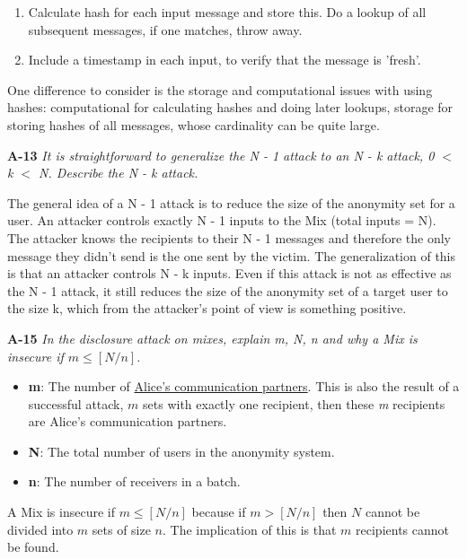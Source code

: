 \documentclass[a4paper]{article}
\newcommand{\Q}[2]{ \vspace{10pt} \textbf{#1} \textit{#2} }
\newcommand{\A}[1]{ #1 }
\begin{document}
\A{
  \begin{enumerate}
    \item Calculate hash for each input message and store this.
    Do a lookup of all subsequent messages, if one matches, 
    throw away.
    \item Include a timestamp in each input, to verify that 
    the message is 'fresh'.
  \end{enumerate}

  One difference to consider is the storage and computational
  issues with using hashes: computational for calculating
  hashes and doing later lookups, storage for storing hashes of
  all messages, whose cardinality can be quite large.
}

\Q{A-13} { %
  It is straightforward to generalize the N - 1 attack to an 
  N - k attack, 0 $<$ k $<$ N. Describe the N - k attack.
}

\A{
  The general idea of a N - 1 attack is to reduce the size of
  the anonymity set for a user. An attacker controls exactly N - 1 
  inputs to the Mix (total inputs = N). The attacker knows
  the recipients to their N - 1 messages and therefore the only 
  message they didn't send is the one sent by the victim.
  The generalization of this is that an attacker controls N - k
  inputs. Even if this attack is not as effective as the N - 1
  attack, it still reduces the size of the anonymity set of a target user 
  to the size k, which from the attacker's point of view
  is something positive.  
}

\Q{A-15} {
  In the disclosure attack on mixes, 
  explain m, N, n and why a Mix is insecure if $m \leq [N / n]$.
}

\A{
  \begin{itemize}
    \item \textbf{m}: The number of \underline{Alice's communication partners}. This is also the result of a successful attack, 
    $m$  sets with exactly one recipient, then these \textit{m}
    recipients are Alice's communication partners. 
    \item \textbf{N}: The total number of users in the anonymity system.
    \item \textbf{n}: The number of receivers in a batch.
  \end{itemize}

  A Mix is insecure if $m \leq [N / n]$ because if $m > [N / n]$
  then $N$ cannot be divided into $m$ sets of size $n$. The implication of this 
  is that $m$ recipients cannot be found.
}
\end{document}
